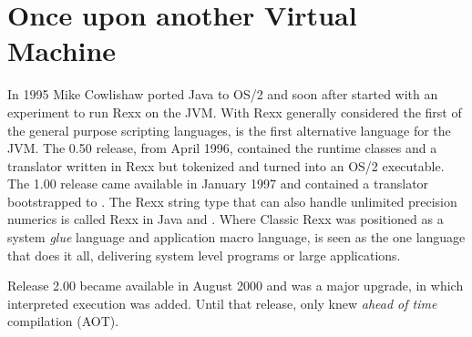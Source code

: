 \section{Once upon another Virtual Machine}
In 1995 Mike Cowlishaw ported Java\textsuperscript{\texttrademark} to OS/2\textsuperscript{\texttrademark} and soon after started with
an experiment to run Rexx on the JVM\textsuperscript{\texttrademark}. With Rexx generally considered
the first of the general purpose scripting languages, \nr{}\textsuperscript{\texttrademark}  is the
first alternative language for the JVM. The 0.50 release, from April
1996, contained the \nr{} runtime classes and a translator written
in Rexx but tokenized and turned into an OS/2 executable. The 1.00
release came available in January 1997 and contained a translator
bootstrapped to \nr{}. The Rexx string type that can also handle
unlimited precision numerics is called Rexx in Java and \nr{}.
Where Classic Rexx was positioned as a system \emph{glue} language and
application macro language, \nr{} is seen as the one language that
does it all, delivering system level programs or large applications.

Release 2.00 became available in August 2000 and was a major upgrade,
in which interpreted execution was added. Until that release, \nr{}
only knew \emph{ahead of time} compilation (AOT).

